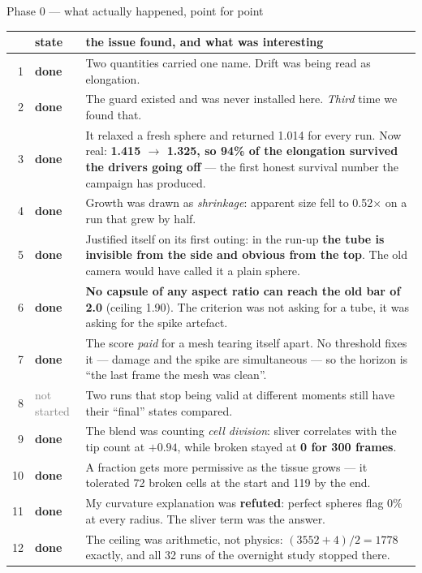 \documentclass[11pt,a4paper]{article}
\newcommand{\dn}{\textcolor{good}{\textbf{done}}}
\newcommand{\ns}{\textcolor{grey}{not started}}
\begin{document}
\begin{phasebox}{Phase 0 --- what actually happened, point for point}
\footnotesize
\begin{tabular}{@{}r@{.\ } l p{9.1cm}@{}}
\toprule
& \textbf{state} & \textbf{the issue found, and what was interesting}\\
\midrule
1 & \dn & Two quantities carried one name. Drift was being read as elongation.\\
2 & \dn & The guard existed and was never installed here. \emph{Third} time we found that.\\
3 & \dn & It relaxed a fresh sphere and returned 1.014 for every run. Now real:
          \textbf{1.415 $\to$ 1.325, so 94\% of the elongation survived the drivers going off} ---
          the first honest survival number the campaign has produced.\\
4 & \dn & Growth was drawn as \emph{shrinkage}: apparent size fell to 0.52$\times$ on a run that
          grew by half.\\
5 & \dn & Justified itself on its first outing: in the run-up \textbf{the tube is invisible from
          the side and obvious from the top}. The old camera would have called it a plain sphere.\\
6 & \dn & \textbf{No capsule of any aspect ratio can reach the old bar of 2.0} (ceiling 1.90). The
          criterion was not asking for a tube, it was asking for the spike artefact.\\
7 & \dn & The score \emph{paid} for a mesh tearing itself apart. No threshold fixes it --- damage
          and the spike are simultaneous --- so the horizon is ``the last frame the mesh was
          clean''.\\
8 & \ns & Two runs that stop being valid at different moments still have their ``final'' states
          compared.\\
9 & \dn & The blend was counting \emph{cell division}: sliver correlates with the tip count at
          $+0.94$, while broken stayed at \textbf{0 for 300 frames}.\\
10 & \dn & A fraction gets more permissive as the tissue grows --- it tolerated 72 broken cells at
          the start and 119 by the end.\\
11 & \dn & My curvature explanation was \textbf{refuted}: perfect spheres flag 0\% at every radius.
          The sliver term was the answer.\\
12 & \dn & The ceiling was arithmetic, not physics: $(3552{+}4)/2 = 1778$ exactly, and all 32 runs of the overnight study stopped there.\\

\end{tabular}
\end{phasebox}
\end{document}
